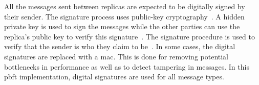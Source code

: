 All the messages sent between replicas are expected to be digitally signed by their sender. The signature process uses public-key cryptography~\cite[p.~257,p.267]{BOOK:BuildDepDistSyst}. A hidden private key is used to sign the messages while the other parties can use the replica's public key to verify this signature~\cite[p.~417]{PAPER:PBFTRecovery}. The signature procedure is used to verify that the sender is who they claim to be~\cite[p.~3]{PAPER:OGPBFT}. In some cases, the digital signatures are replaced with a \ac{mac}. This is done for removing potential bottlenecks in performance as well as to detect tampering in messages\cites[p.~257]{BOOK:BuildDepDistSyst}[p.~3,8]{PAPER:OGPBFT}. In this \ac{pbft} implementation, digital signatures are used for all message types.


